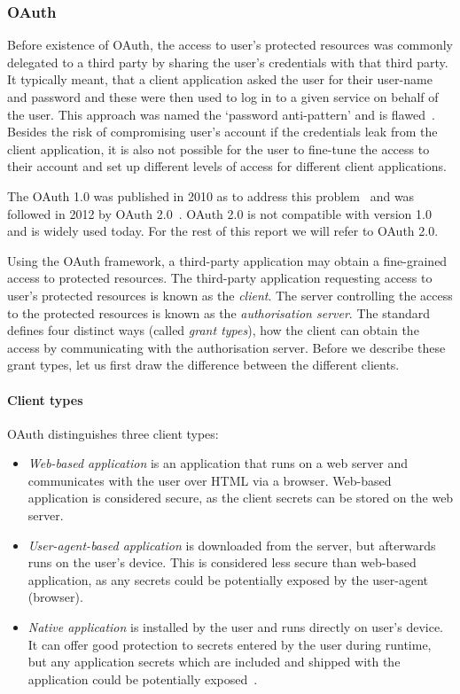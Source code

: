 \subsubsection{OAuth} \label{sec:OAuth_2}

Before existence of OAuth, the access to user's protected resources was commonly delegated to a third party by sharing the user's credentials with that third party. It typically meant, that a client application asked the user for their user-name and password and these were then used to log in to a given service on behalf of the user. This approach was named the `password anti-pattern' and is flawed~\cite{Paul2010OAuthAnti-pattern}. Besides the risk of compromising user's account if the credentials leak from the client application, it is also not possible for the user to fine-tune the access to their account and set up different levels of access for different client applications. 

The OAuth 1.0 was published in 2010 as to address this problem~\cite{Hammer-Lahav2010TheProtocol} and was followed in 2012 by OAuth 2.0~\cite{Hardt2012TheFramework}. OAuth 2.0 is not compatible with version 1.0 and is widely used today. For the rest of this report we will refer to OAuth 2.0.

Using the OAuth framework, a third-party application may obtain a fine-grained access to protected resources. The third-party application requesting access to user's protected resources is known as the \textit{client}. The server controlling the access to the protected resources is known as the \textit{authorisation server}. The standard defines four distinct ways (called \textit{grant types}), how the client can obtain the access by communicating with the authorisation server. Before we describe these grant types, let us first draw the difference between the different clients.

\paragraph{Client types} OAuth distinguishes three client types:
\begin{itemize}[noitemsep]
    \item \textit{Web-based application} is an application that runs on a web server and communicates with the user over HTML via a browser. Web-based application is considered secure, as the client secrets can be stored on the web server.
    \item \textit{User-agent-based application} is downloaded from the server, but afterwards runs on the user's device. This is considered less secure than web-based application, as any secrets could be potentially exposed by the user-agent (browser).
    \item \textit{Native application} is installed by the user and runs directly on user's device. It can offer good protection to secrets entered by the user during runtime, but any application secrets which are included and shipped with the application could be potentially exposed~\cite{Hardt2012TheFramework}.
\end{itemize}

